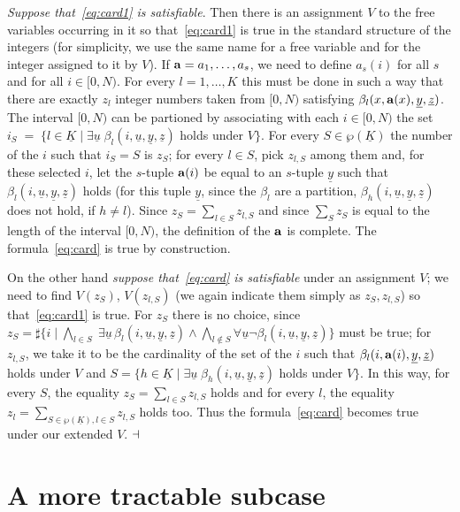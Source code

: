 \documentclass[11pt,a4paper]{article}
\newcommand{\uu}{\ensuremath{\underline u}}
\newcommand{\uy}{\ensuremath{\underline y}}
\newcommand{\uz}{\ensuremath{\underline z}}
\newcommand{\ta}{\ensuremath{{\bf a}}\xspace}
\begin{document}
\emph{Suppose that~\eqref{eq:card1} is satisfiable}. Then there is an assignment $V$ to the  free variables occurring in it so that~\eqref{eq:card1} is true 
in the standard structure of the integers (for simplicity, we use the same name for a free variable and for the integer assigned to it by $V$). If $\ta=a_1, \dots, a_s$,
we need to define $a_s(i)$ for all $s$ and for all $i\in [0, N)$.
For every $l=1, \dots, K$ this must be done in such a way that there are exactly $z_l$ integer numbers  taken from $[0,N)$ satisfying $\beta_l(x, \ta(x),\uy, \uz)$.
The interval $[0,N)$ can be partioned by associating with each $i\in [0, N)$ the set  
$i_S\;=\;\{ l\in \underline{K} \mid \exists \uu\;\beta_l(i,\uu, \uy, \uz)$ holds under $V\}$. For every $S\in \wp(\underline{K})$ the number of the $i$ such that $i_S=S$ is $z_S$; for every $l\in S$, pick $z_{l,S}$ among them and, for these selected $i$,  let the $s$-tuple $\ta(i)$ be equal to an $s$-tuple $\uy$ such that $\beta_l(i,\uu, \uy, \uz)$ holds (for this tuple $\uy$, since the $\beta_l$ are a partition, $\beta_h(i,\uu, \uy, \uz)$ does not hold, if $h\neq l$).
Since $z_{ S} = \sum_{l\in S} z_{l, S}$ and since $\sum_S z_S$ is equal to the length of the interval $[0,N)$, the definition of the $\ta$ is
complete. The formula~\eqref{eq:card} is true by construction.



On the other hand \emph{suppose that~\eqref{eq:card} is satisfiable} under an assignment $V$; we need to find $V(z_S)$, $V(z_{l,S})$ 
(we again indicate them simply as $z_S, z_{l,S}$)
so that~\eqref{eq:card1} is true. For $z_S$ there is no choice, since $z_S=\sharp \{ i\mid \bigwedge_{l\in  S} \;\exists \uu \, 
\beta_l(i,\uu,\uy,\uz) \wedge\bigwedge_{l\not\in S} \forall \uu \neg \beta_l(i,\uu,\uy,\uz)\}$ must be true; for $z_{l,S}$, we take it to be the cardinality of the set of the 
$i$ such that $\beta_l(i, \ta(i), \uy, \uz)$ holds under $V$ and $S= \{ h\in \underline{K} \mid \exists \uu\;\beta_h(i,\uu, \uy,\uz)$ holds under $V\}$. In this way, 
for every $S$, the equality $ z_{ S} = \sum_{l\in S} z_{l, S}$ holds and for every $l$, the equality
$z_l = \sum_{S\in \wp(\underline K), l\in S} z_{l,S}$ holds too. Thus the formula~\eqref{eq:card} becomes true under our extended $V$.
 $\hfill\dashv$



\section{A more tractable subcase}\label{sec:tractable}
\end{document}
